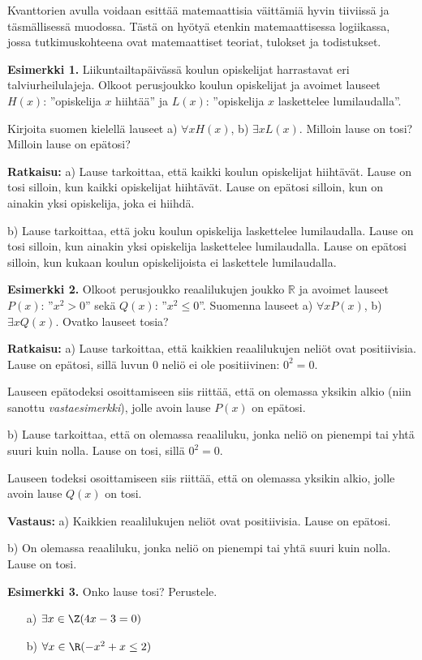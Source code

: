 Kvanttorien avulla voidaan esittää matemaattisia väittämiä hyvin tiiviissä ja täsmällisessä muodossa. Tästä on hyötyä etenkin matemaattisessa logiikassa, jossa tutkimuskohteena ovat matemaattiset teoriat, tulokset ja todistukset. 

{\bf Esimerkki 1.} Liikuntailtapäivässä koulun opiskelijat harrastavat eri talviurheilulajeja. Olkoot perusjoukko koulun opiskelijat ja avoimet lauseet $H(x)$: ''opiskelija $x$
 hiihtää'' ja $L(x)$: ''opiskelija $x$ laskettelee lumilaudalla''.

Kirjoita suomen kielellä lauseet a) $\forall x H(x)$,  b)  $\exists x L(x)$. Milloin lause on tosi? Milloin lause on epätosi?

{\bf Ratkaisu:} a) Lause tarkoittaa, että kaikki koulun opiskelijat hiihtävät. Lause on tosi silloin, kun
kaikki opiskelijat hiihtävät. Lause on epätosi silloin, kun on ainakin yksi opiskelija, joka ei 
hiihdä.  

b) Lause tarkoittaa, että joku koulun opiskelija laskettelee lumilaudalla. Lause on tosi
silloin, kun ainakin yksi opiskelija laskettelee lumilaudalla. Lause on epätosi silloin, kun 
kukaan koulun opiskelijoista ei laskettele lumilaudalla. 

{\bf Esimerkki 2.}
Olkoot perusjoukko reaalilukujen joukko $\mathbb{R}$ ja avoimet lauseet  $P(x)$: ''$x^2 > 0$''  sekä  
$Q(x)$: ''$x^2\le  0$''. Suomenna lauseet  a) $\forall x P(x)$,   b) $\exists x Q(x)$. Ovatko lauseet tosia?

{\bf Ratkaisu:}	a) Lause tarkoittaa, että kaikkien reaalilukujen neliöt ovat positiivisia. Lause on epätosi, sillä luvun $0$ neliö ei ole positiivinen: $0^2=0$.

Lauseen epätodeksi osoittamiseen siis riittää, että on olemassa yksikin alkio (niin sanottu {\em vastaesimerkki}), jolle avoin lause $P(x)$ on epätosi.

b)  Lause tarkoittaa, että on olemassa reaaliluku, jonka neliö on pienempi tai 
yhtä suuri kuin nolla. Lause on tosi, sillä $0^2 = 0$.

Lauseen todeksi osoittamiseen siis riittää, että on olemassa yksikin alkio, jolle avoin lause $Q(x)$ on tosi.

{\bf Vastaus:}	
a) Kaikkien reaalilukujen neliöt ovat positiivisia. Lause on epätosi.

b) On olemassa reaaliluku, jonka neliö on pienempi tai yhtä suuri kuin nolla. Lause on tosi. 


{\bf Esimerkki 3.}
Onko lause tosi? Perustele.
\begin{itemize}
\item[a)] $\exists x\in \Z(4x - 3 = 0)$
\item[b)] $\forall x\in \R(-x^2 + x \le 2)$
\end{itemize}

